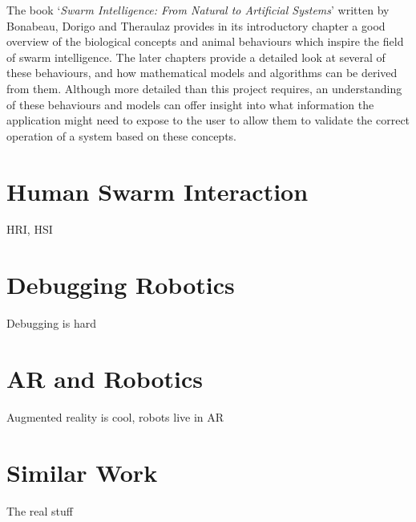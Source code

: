 The book `\textit{Swarm Intelligence: From Natural to Artificial Systems}' written by Bonabeau, Dorigo and Theraulaz \cite{Bonabeau:1999} provides in its introductory chapter a good overview of the biological concepts and animal behaviours which inspire the field of swarm intelligence. The later chapters provide a detailed look at several of these behaviours, and how mathematical models and algorithms can be derived from them. Although more detailed than this project requires, an understanding of these behaviours and models can offer insight into what information the application might need to expose to the user to allow them to validate the correct operation of a system based on these concepts.


\section{Human Swarm Interaction} \label{HumanSwarmInteraction}
HRI, HSI


\section{Debugging Robotics} \label{RoboticsDebugging}
Debugging is hard


\section{AR and Robotics} \label{AugmentedReality}
Augmented reality is cool, robots live in AR

\section{Similar Work} \label{SimilarWork}
The real stuff
